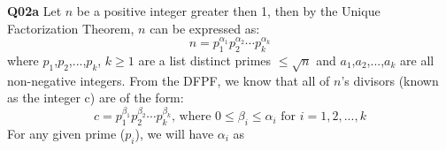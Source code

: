 \documentclass[11pt]{article}
\begin{document}
\textbf{Q02a} Let $n$ be a positive integer greater then 1, then by the Unique Factorization Theorem, $n$ can be expressed as:
\[  n = p_1^{\alpha_1}p_2^{\alpha_2}\cdots p_k^{\alpha_k} \]
where $p_1$,$p_2$,...,$p_k$, $k\geq1$ are a list distinct primes $\leq \sqrt{n}$ and $a_1$,$a_2$,...,$a_k$ are all non-negative integers. From the DFPF, we know that all of $n$'s divisors (known as the integer c) are of the form:
\[  c = p_1^{\beta_1}p_2^{\beta_2}\cdots p_k^{\beta_k} \text{, where } 0\leq\beta_i\leq\alpha_i \text{ for  }  i = 1,2,...,k\]
For any given prime ($p_i$), we will have $\alpha_i$ as 
\end{document}
